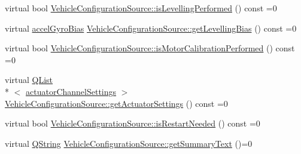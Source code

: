 \begin{DoxyCompactItemize}
\item 
virtual bool \hyperlink{group___vehicle_configuration_source_ga18b570857c0bc2d0e77ad0be0a324f37}{Vehicle\-Configuration\-Source\-::is\-Levelling\-Performed} () const =0
\item 
virtual \hyperlink{structaccel_gyro_bias}{accel\-Gyro\-Bias} \hyperlink{group___vehicle_configuration_source_gae596e5378b9bc9d126c6c6207f473567}{Vehicle\-Configuration\-Source\-::get\-Levelling\-Bias} () const =0
\item 
virtual bool \hyperlink{group___vehicle_configuration_source_gaf2d0f922c260a7bd4481d565f1b46589}{Vehicle\-Configuration\-Source\-::is\-Motor\-Calibration\-Performed} () const =0
\item 
virtual \hyperlink{class_q_list}{Q\-List}\\*
$<$ \hyperlink{structactuator_channel_settings}{actuator\-Channel\-Settings} $>$ \hyperlink{group___vehicle_configuration_source_ga21ab7c07bd3271df54d776b80b974a0f}{Vehicle\-Configuration\-Source\-::get\-Actuator\-Settings} () const =0
\item 
virtual bool \hyperlink{group___vehicle_configuration_source_ga53deeed450e4e532d976fde372be6a54}{Vehicle\-Configuration\-Source\-::is\-Restart\-Needed} () const =0
\item 
virtual \hyperlink{group___u_a_v_objects_plugin_gab9d252f49c333c94a72f97ce3105a32d}{Q\-String} \hyperlink{group___vehicle_configuration_source_ga1f54adbaeda45aac3778c52569dfa2f9}{Vehicle\-Configuration\-Source\-::get\-Summary\-Text} ()=0
\end{DoxyCompactItemize}
